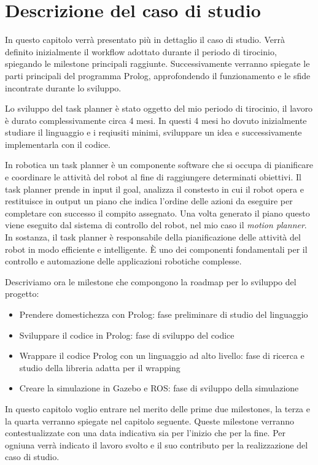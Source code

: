 \chapter{Descrizione del caso di studio}
\label{cha:descrizionecasostudio}
In questo capitolo verrà presentato più in dettaglio il caso di studio. Verrà definito inizialmente il workflow adottato durante il periodo di tirocinio, spiegando le milestone principali raggiunte.
Successivamente verranno spiegate le parti principali del programma Prolog, approfondendo il funzionamento e le sfide incontrate durante lo sviluppo.

Lo sviluppo del task planner è stato oggetto del mio periodo di tirocinio, il lavoro è durato complessivamente circa 4 mesi. In questi 4 mesi ho dovuto inizialmente studiare il linguaggio e i reqiusiti minimi, sviluppare un idea e successivamente implementarla con il codice.

In robotica un task planner è un componente software che si occupa di pianificare e coordinare le attività del robot al fine di raggiungere determinati obiettivi.
Il task planner prende in input il goal, analizza il constesto in cui il robot opera e restituisce in output un piano che indica l'ordine delle azioni da eseguire per completare con successo il compito assegnato.
Una volta generato il piano questo viene eseguito dal sistema di controllo del robot, nel mio caso il \textit{motion planner}. In sostanza, il task planner è responsabile della pianificazione delle attività del robot in modo efficiente e intelligente. È uno dei componenti fondamentali per il controllo e automazione delle applicazioni robotiche complesse.

Descriviamo ora le milestone che compongono la roadmap per lo sviluppo del progetto:
\begin{itemize}
    \item Prendere domestichezza con Prolog: fase preliminare di studio del linguaggio
    \item Sviluppare il codice in Prolog: fase di sviluppo del codice
    \item Wrappare il codice Prolog con un linguaggio ad alto livello: fase di ricerca e studio della libreria adatta per il wrapping
    \item Creare la simulazione in Gazebo e ROS: fase di sviluppo della simulazione
\end{itemize}
In questo capitolo voglio entrare nel merito delle prime due milestones, la terza e la quarta verranno spiegate nel capitolo seguente.
Queste milestone verranno contestualizzate con una data indicativa sia per l'inizio che per la fine. Per ogniuna verrà indicato il lavoro svolto e il suo contributo per la realizzazione del caso di studio.


